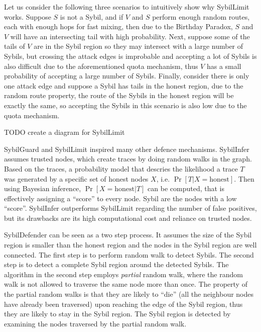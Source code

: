 Let us consider the following three scenarios to intuitively show why SybilLimit
works. Suppose $S$ is not a Sybil, and if $V$ and $S$ perform enough random
routes, each with enough hops for fast mixing, then due to the Birthday Paradox,
$S$ and $V$ will have an intersecting tail with high probability. Next, suppose
some of the tails of $V$ are in the Sybil region so they may intersect with a
large number of Sybils, but crossing the attack edges is improbable and
accepting a lot of Sybils is also difficult due to the aforementioned quota
mechanism, thus $V$ has a small probability of accepting a large number of
Sybils. Finally, consider there is only one attack edge and suppose a Sybil has
tails in the honest region, due to the random route property, the route of the
Sybils in the honest region will be exactly the same, so accepting the Sybils in
this scenario is also low due to the quota mechanism.

TODO create a diagram for SybilLimit

SybilGuard and SybilLimit inspired many other defence mechanisms.
SybilInfer\cite{danezis2009sybilinfer} assumes trusted nodes, which create
traces by doing random walks in the graph. Based on the traces, a probability
model that descries the likelihood a trace $T$ was generated by a specific set
of honest nodes $X$, i.e. $\Pr[ T | X = \text{honest}]$. Then using Bayesian
inference, $\Pr[ X = \text{honest}| T ]$ can be computed, that is effectively
assigning a ``score'' to every node. Sybil are the nodes with a low ``score''.
SybilInfer outperforms SybilLimit regarding the number of false positives, but
its drawbacks are its high computational cost and reliance on trusted nodes.

SybilDefender\cite{wei2012sybildefender} can be seen as a two step process. It
assumes the size of the Sybil region is smaller than the honest region and the
nodes in the Sybil region are well connected. The first step is to perform
random walk to detect Sybils. The second step is to detect a complete Sybil
region around the detected Sybils. The algorithm in the second step employs
\emph{partial} random walk, where the random walk is not allowed to traverse the
same node more than once. The property of the partial random walks is that they
are likely to ``die'' (all the neighbour nodes have already been traversed) upon
reaching the edge of the Sybil region, thus they are likely to stay in the Sybil
region. The Sybil region is detected by examining the nodes traversed by the
partial random walk.


